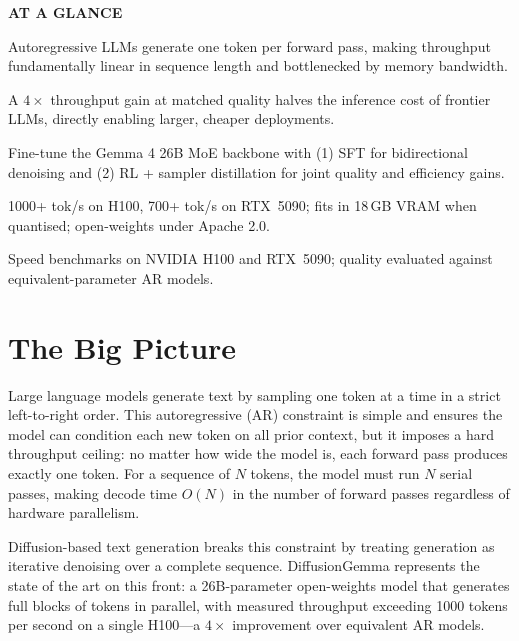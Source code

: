 \documentclass[10pt,twocolumn]{article}
\begin{document}
\begin{mdframed}[backgroundcolor=boxgray,linecolor=rulered,linewidth=1pt,
    innerleftmargin=6pt,innerrightmargin=6pt,
    innertopmargin=6pt,innerbottommargin=6pt]
\textbf{\small AT A GLANCE}\par\vspace{4pt}
\begin{description}[leftmargin=0pt,labelsep=4pt,itemsep=2pt,parsep=0pt,
    font=\small\bfseries]
  \item[Problem:] Autoregressive LLMs generate one token per forward pass, making
    throughput fundamentally linear in sequence length and bottlenecked by memory bandwidth.
  \item[Why it matters:] A $4\times$ throughput gain at matched quality halves the
    inference cost of frontier LLMs, directly enabling larger, cheaper deployments.
  \item[Method:] Fine-tune the Gemma 4 26B MoE backbone with (1) SFT for bidirectional
    denoising and (2) RL + sampler distillation for joint quality and efficiency gains.
  \item[Result:] 1000+ tok/s on H100, 700+ tok/s on RTX~5090; fits in 18\,GB VRAM when
    quantised; open-weights under Apache 2.0.
  \item[Evidence:] Speed benchmarks on NVIDIA H100 and RTX~5090; quality evaluated against
    equivalent-parameter AR models.
\end{description}
\end{mdframed}

\section{The Big Picture}

Large language models generate text by sampling one token at a time in a strict
left-to-right order. This autoregressive (AR) constraint is simple and ensures
the model can condition each new token on all prior context, but it imposes a hard
throughput ceiling: no matter how wide the model is, each forward pass produces
exactly one token. For a sequence of $N$ tokens, the model must run $N$ serial
passes, making decode time $O(N)$ in the number of forward passes regardless of
hardware parallelism.

Diffusion-based text generation breaks this constraint by treating generation as
iterative denoising over a complete sequence. DiffusionGemma represents the state
of the art on this front: a 26B-parameter open-weights model that generates full
blocks of tokens in parallel, with measured throughput exceeding 1000 tokens per
second on a single H100---a $4\times$ improvement over equivalent AR models.
\end{document}
